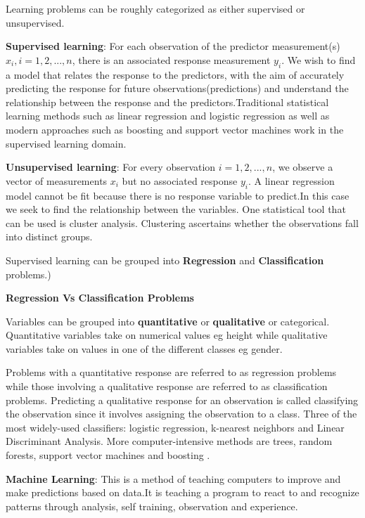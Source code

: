 \citep{berry1997data} Learning problems can be roughly categorized as either supervised or unsupervised.

\textbf{Supervised learning}: For each observation of the predictor measurement(s) $x_{i},i=1,2,...,n$, there is an associated response measurement $y_{i}$. We wish to find a model that relates the response to the predictors, with the aim of accurately predicting the response for future observations(predictions) and understand the relationship between the response and the predictors.Traditional statistical learning methods such as linear regression and logistic regression as well as modern approaches such as boosting and support vector machines work in the supervised learning domain.

\textbf{Unsupervised learning}: For every observation $i=1,2,...,n$, we observe a vector of measurements $x_{i}$ but no associated response $y_{i}$. A linear regression model cannot be fit because there is no response variable to predict.In this case we seek to find the relationship between the variables. One statistical tool that can be used is cluster analysis. Clustering ascertains whether the observations fall into distinct groups.

Supervised learning can be grouped into \textbf{Regression} and \textbf{Classification} problems.)

\begin{center}
\textbf{Regression Vs Classification Problems}
\end{center}
Variables can be grouped into \textbf{quantitative} or \textbf{qualitative} or categorical. Quantitative variables take on numerical values eg height while qualitative variables take on values in one of the different classes eg gender.

Problems with a quantitative response are referred to as regression problems while those involving a qualitative response are referred to as classification problems. Predicting a qualitative response for an observation is called classifying the observation since it involves assigning the observation to a class. Three of the most widely-used classifiers: logistic regression, k-nearest neighbors and Linear Discriminant Analysis. More computer-intensive methods are trees, random forests, support vector machines and boosting \citep{james2014introduction}.

\textbf{Machine Learning}: This is a method of teaching computers to improve and make predictions based on data.It is teaching a program to react to and recognize patterns through analysis, self training, observation and experience.

